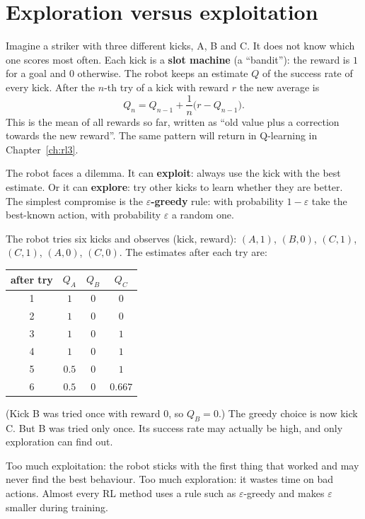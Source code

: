\section*{Exploration versus exploitation}
Imagine a striker with three different kicks, A, B and C. It does not know which one scores most often. Each kick is a \textbf{slot machine} (a ``bandit''): the reward is $1$ for a goal and $0$ otherwise. The robot keeps an estimate $Q$ of the success rate of every kick. After the $n$-th try of a kick with reward $r$ the new average is
\[
Q_{n}=Q_{n-1}+\frac{1}{n}\bigl(r-Q_{n-1}\bigr).
\]
This is the mean of all rewards so far, written as ``old value plus a correction towards the new reward''. The same pattern will return in Q-learning in Chapter~\ref{ch:rl3}.

The robot faces a dilemma. It can \textbf{exploit}: always use the kick with the best estimate. Or it can \textbf{explore}: try other kicks to learn whether they are better. The simplest compromise is the \textbf{$\varepsilon$-greedy} rule: with probability $1-\varepsilon$ take the best-known action, with probability $\varepsilon$ a random one.

\begin{example}
The robot tries six kicks and observes (kick, reward): $(A,1)$, $(B,0)$, $(C,1)$, $(C,1)$, $(A,0)$, $(C,0)$. The estimates after each try are:
\begin{center}
\renewcommand{\arraystretch}{1.2}
\begin{tabular}{c|ccc}
after try & $Q_A$ & $Q_B$ & $Q_C$\\ \hline
1 & $1$ & $0$ & $0$\\
2 & $1$ & $0$ & $0$\\
3 & $1$ & $0$ & $1$\\
4 & $1$ & $0$ & $1$\\
5 & $0.5$ & $0$ & $1$\\
6 & $0.5$ & $0$ & $0.667$
\end{tabular}
\end{center}
(Kick B was tried once with reward $0$, so $Q_B=0$.) The greedy choice is now kick C. But B was tried only once. Its success rate may actually be high, and only exploration can find out.
\end{example}

\begin{keyidea}
Too much exploitation: the robot sticks with the first thing that worked and may never find the best behaviour. Too much exploration: it wastes time on bad actions. Almost every RL method uses a rule such as $\varepsilon$-greedy and makes $\varepsilon$ smaller during training.
\end{keyidea}

